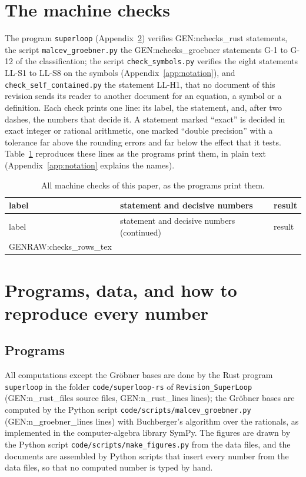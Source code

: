 \section{The machine checks}
\label{app:checks}

The program \texttt{superloop} (Appendix~\ref{app:data}) verifies {{GEN:nchecks_rust}} statements, the
script \texttt{malcev\_groebner.py} the {{GEN:nchecks_groebner}} statements G-1 to G-12 of the
classification; the script \texttt{check\_symbols.py} verifies the eight statements LL-S1 to LL-S8 on the
symbols (Appendix~\ref{app:notation}), and \texttt{check\_self\_contained.py} the statement LL-H1, that
no document of this revision sends its reader to another document for an equation, a symbol or a
definition. Each check prints one line: its label, the statement, and, after two dashes, the numbers
that decide it. A statement marked ``exact'' is decided in exact integer or rational arithmetic, one
marked ``double precision'' with a tolerance far above the rounding errors and far below the effect
that it tests. Table~\ref{tab:checks} reproduces these lines as the programs print them, in plain text
(Appendix~\ref{app:notation} explains the names).

{\footnotesize\longtabledepth
\begin{longtable}{p{}p{}p{}}
\caption{All machine checks of this paper, as the programs print them.}\label{tab:checks}\\
\toprule
label & statement and decisive numbers & result\\
\midrule
\endfirsthead
\toprule
label & statement and decisive numbers (continued) & result\\
\midrule
\endhead
\bottomrule
\endfoot
{{GENRAW:checks_rows_tex}}
\end{longtable}
}\longtabledepthrestore

\section{Programs, data, and how to reproduce every number}
\label{app:data}

\subsection{Programs}

All computations except the Gr\"obner bases are done by the Rust program \texttt{superloop} in the
folder \texttt{code/superloop-rs} of \texttt{Revision\_SuperLoop} ({{GEN:n_rust_files}} source files,
{{GEN:n_rust_lines}} lines); the Gr\"obner bases are computed by the Python script
\texttt{code/scripts/malcev\_groebner.py} ({{GEN:n_groebner_lines}} lines) with Buchberger's algorithm
over the rationals, as implemented in the computer-algebra library SymPy. The figures are drawn by the
Python script \texttt{code/scripts/make\_figures.py} from the data files, and the documents are
assembled by Python scripts that insert every number from the data files, so that no computed number
is typed by hand.

